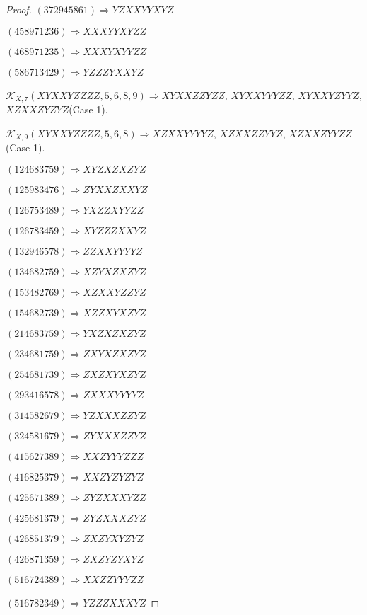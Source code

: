 \documentclass[12pt]{article}
\theoremstyle{plain}
\theoremstyle{definition}
\theoremstyle{remark}
\newcommand{\fancy}[1]{\mathcal{#1}}
\def\K{\fancy{K}}
\begin{document}
\begin{proof}
	$(3 7 2 9 4 5 8 6 1)\Rightarrow YZXXYYXYZ$
	
	$(4 5 8 9 7 1 2 3 6)\Rightarrow XXXYYXYZZ$
	
	$(4 6 8 9 7 1 2 3 5)\Rightarrow XXXYXYYZZ$
	
	$(5 8 6 7 1 3 4 2 9)\Rightarrow YZZZYXXYZ$
	
	
	
	$\K_{X,7}(XYXXYZZZZ,5, 6, 8, 9)\Rightarrow $$XYXXZZYZZ$, $XYXXYYYZZ$, $XYXXYZYYZ$, $XZXXZYZYZ$(Case 1).
	
	$\K_{X,9}(XYXXYZZZZ,5, 6, 8)\Rightarrow $$XZXXYYYYZ$, $XZXXZZYYZ$, $XZXXZYYZZ$(Case 1).
	
	
	
	$(1 2 4 6 8 3 7 5 9)\Rightarrow XYZXZXZYZ$
	
	$(1 2 5 9 8 3 4 7 6)\Rightarrow ZYXXZXXYZ$
	
	$(1 2 6 7 5 3 4 8 9)\Rightarrow YXZZXYYZZ$
	
	$(1 2 6 7 8 3 4 5 9)\Rightarrow XYZZZXXYZ$
	
	$(1 3 2 9 4 6 5 7 8)\Rightarrow ZZXXYYYYZ$
	
	$(1 3 4 6 8 2 7 5 9)\Rightarrow XZYXZXZYZ$
	
	$(1 5 3 4 8 2 7 6 9)\Rightarrow XZXXYZZYZ$
	
	$(1 5 4 6 8 2 7 3 9)\Rightarrow XZZXYXZYZ$
	
	$(2 1 4 6 8 3 7 5 9)\Rightarrow YXZXZXZYZ$
	
	$(2 3 4 6 8 1 7 5 9)\Rightarrow ZXYXZXZYZ$
	
	$(2 5 4 6 8 1 7 3 9)\Rightarrow ZXZXYXZYZ$
	
	$(2 9 3 4 1 6 5 7 8)\Rightarrow ZXXXYYYYZ$
	
	$(3 1 4 5 8 2 6 7 9)\Rightarrow YZXXXZZYZ$
	
	$(3 2 4 5 8 1 6 7 9)\Rightarrow ZYXXXZZYZ$
	
	$(4 1 5 6 2 7 3 8 9)\Rightarrow XXZYYYZZZ$
	
	$(4 1 6 8 2 5 3 7 9)\Rightarrow XXZYZYZYZ$
	
	$(4 2 5 6 7 1 3 8 9)\Rightarrow ZYZXXXYZZ$
	
	$(4 2 5 6 8 1 3 7 9)\Rightarrow ZYZXXXZYZ$
	
	$(4 2 6 8 5 1 3 7 9)\Rightarrow ZXZYXYZYZ$
	
	$(4 2 6 8 7 1 3 5 9)\Rightarrow ZXZYZYXYZ$
	
	$(5 1 6 7 2 4 3 8 9)\Rightarrow XXZZYYYZZ$
	
	$(5 1 6 7 8 2 3 4 9)\Rightarrow YZZZXXXYZ$
	

\end{proof}
\end{document}
